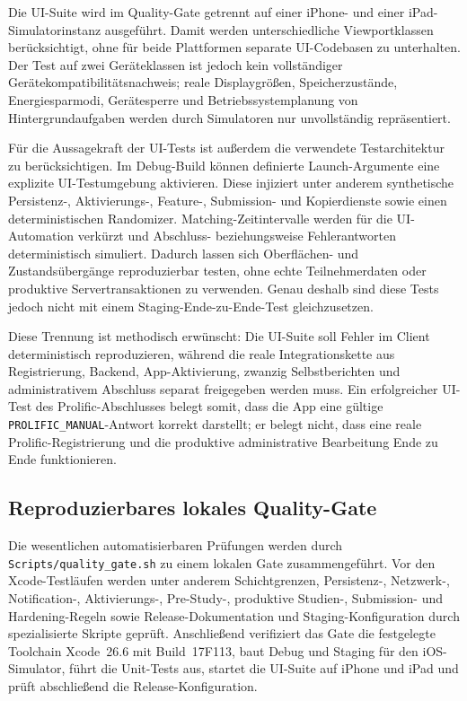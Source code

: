 \begin{neu}
Die UI-Suite wird im Quality-Gate getrennt auf einer iPhone- und einer iPad-Simulatorinstanz ausgeführt. Damit werden unterschiedliche Viewportklassen berücksichtigt, ohne für beide Plattformen separate UI-Codebasen zu unterhalten. Der Test auf zwei Geräteklassen ist jedoch kein vollständiger Gerätekompatibilitätsnachweis; reale Displaygrößen, Speicherzustände, Energiesparmodi, Gerätesperre und Betriebssystemplanung von Hintergrundaufgaben werden durch Simulatoren nur unvollständig repräsentiert.

Für die Aussagekraft der UI-Tests ist außerdem die verwendete Testarchitektur zu berücksichtigen. Im Debug-Build können definierte Launch-Argumente eine explizite UI-Testumgebung aktivieren. Diese injiziert unter anderem synthetische Persistenz-, Aktivierungs-, Feature-, Submission- und Kopierdienste sowie einen deterministischen Randomizer. Matching-Zeitintervalle werden für die UI-Automation verkürzt und Abschluss- beziehungsweise Fehlerantworten deterministisch simuliert. Dadurch lassen sich Oberflächen- und Zustandsübergänge reproduzierbar testen, ohne echte Teilnehmerdaten oder produktive Servertransaktionen zu verwenden. Genau deshalb sind diese Tests jedoch nicht mit einem Staging-Ende-zu-Ende-Test gleichzusetzen.

Diese Trennung ist methodisch erwünscht: Die UI-Suite soll Fehler im Client deterministisch reproduzieren, während die reale Integrationskette aus Registrierung, Backend, App-Aktivierung, zwanzig Selbstberichten und administrativem Abschluss separat freigegeben werden muss. Ein erfolgreicher UI-Test des Prolific-Abschlusses belegt somit, dass die App eine gültige \texttt{PROLIFIC\_MANUAL}-Antwort korrekt darstellt; er belegt nicht, dass eine reale Prolific-Registrierung und die produktive administrative Bearbeitung Ende zu Ende funktionieren.

\subsection{Reproduzierbares lokales Quality-Gate}

Die wesentlichen automatisierbaren Prüfungen werden durch \texttt{Scripts/quality\_gate.sh} zu einem lokalen Gate zusammengeführt. Vor den Xcode-Testläufen werden unter anderem Schichtgrenzen, Persistenz-, Netzwerk-, Notification-, Aktivierungs-, Pre-Study-, produktive Studien-, Submission- und Hardening-Regeln sowie Release-Dokumentation und Staging-Konfiguration durch spezialisierte Skripte geprüft. Anschließend verifiziert das Gate die festgelegte Toolchain Xcode~26.6 mit Build~17F113, baut Debug und Staging für den iOS-Simulator, führt die Unit-Tests aus, startet die UI-Suite auf iPhone und iPad und prüft abschließend die Release-Konfiguration.


\end{neu}
